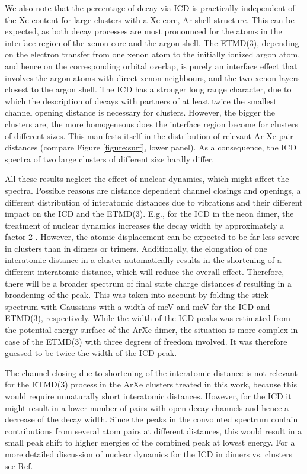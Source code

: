 We also note that the percentage of decay via ICD is practically
independent of the Xe content for large clusters with a Xe core, Ar shell structure.
This can be expected, as both decay processes are most pronounced for the
atoms in the interface region of the xenon core and the argon shell.
The ETMD(3), depending on the electron transfer from one xenon atom to the
initially ionized argon atom, and hence on the corresponding orbital overlap,
is purely an interface effect that involves the argon atoms with direct xenon
neighbours, and the two xenon layers closest to the argon shell.
The ICD has a stronger long range character, due to which the description
of decays with partners of at least twice the smallest channel opening
distance is necessary for clusters. However, the bigger the clusters are,
the more homogeneous does the interface region become for clusters of
different sizes. This manifests itself in the distribution of relevant
Ar-Xe pair distances (compare Figure \ref{figure:surf}, lower panel).
As a consequence, the ICD spectra of two large clusters of different size
hardly differ.

All these results neglect the effect of nuclear dynamics, which might
affect the spectra. Possible reasons are distance dependent channel closings
and openings,
a different distribution of interatomic distances due to vibrations
and their different impact on
the ICD and the ETMD(3). E.g., for the ICD in the neon dimer, the treatment of
nuclear dynamics increases the decay width by approximately a factor 2
\cite{Schnorr15}.
However, the atomic displacement can be expected to be far less severe
in clusters than in dimers or trimers. Additionally, 
the elongation of one interatomic distance in a cluster
automatically results in
the shortening of a different interatomic distance, which will reduce
the overall effect. Therefore, there will be a broader spectrum  of final
state charge distances
$d$ resulting in a broadening of the peak. This was taken into
account by folding the stick spectrum with Gaussians with a width of
\unit[300]{meV} and \unit[600]{meV} for the ICD and ETMD(3), respectively.
While the width of the ICD peaks was estimated from the potential energy
surface of the ArXe dimer, the situation is more complex in case of the ETMD(3)
with three degrees of freedom involved. It was therefore guessed to be twice the
width of the ICD peak.

The channel closing due to shortening of the interatomic distance is not
relevant for the ETMD(3) process in the ArXe clusters treated in this work,
because this would require unnaturally short interatomic distances.
However, for the ICD it might result in a lower number of pairs with open
decay channels and hence a decrease of the decay width. 
Since the peaks in the convoluted spectrum 
contain contributions from several atom pairs at different distances, 
this would result
in a small peak shift to higher energies of the combined peak at lowest energy.
For a more detailed discussion of nuclear dynamics for the ICD in dimers vs.
clusters see Ref. 

\clearpage
